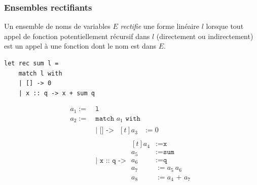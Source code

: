 \begin{frame}[fragile,t]
    \frametitle{Ensembles rectifiants}

    \vspace{-0.2cm}

    \begin{definition}
        Un ensemble de noms de variables $E$ \textit{rectifie} une forme linéaire
        $l$ lorsque tout appel de fonction potentiellement récursif dans $l$
        (directement ou indirectement) est un appel à une fonction dont le nom est
        dans $E$.
    \end{definition}

    \pause

    \small

    \begin{minipage}[t]{0.5\textwidth}
        \small \begin{verbatim}
let rec sum l =
    match l with
    | [] -> 0
    | x :: q -> x + sum q
        \end{verbatim}

    \end{minipage}%
    \begin{minipage}[t]{0.5\textwidth}
        \vspace{-0.8cm}
        \small \begin{align*}
            a_1 :=\  & \texttt{l}                                          \\
            a_2 :=\  & \texttt{match } a_1 \texttt{ with}                  \\
                     & \texttt{| [] -> } \begin{aligned}[t]
                                             a_3 & := 0
                                         \end{aligned}                 \\
                     & \texttt{| x :: q -> } \begin{aligned}[t]
                                                 a_4 & := \texttt{x}           \\
                                                 a_5 & := \texttt{sum}         \\
                                                 a_6 & := \texttt{q}           \\
                                                 a_7 & := a_5 \ a_6            \\
                                                 a_8 & := a_4 \texttt{ + } a_7
                                             \end{aligned}
        \end{align*}


\end{minipage}
\end{frame}
